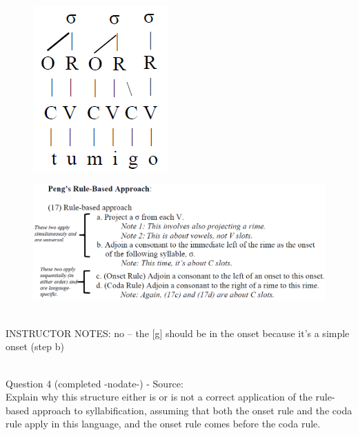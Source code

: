 \documentclass[12pt]{article}
\begin{document}
\begin{figure}[H]
\includegraphics{../images/pengrules_tumigo_no.png}
\end{figure}
\begin{figure}[H]
\includegraphics{../images/peng_rules.png}
\end{figure}

~\\
INSTRUCTOR NOTES: no -- the [g] should be in the onset because it's a simple onset (step b)


~\\

{\large Question 4} (completed -nodate-) - Source: \\

Explain why this structure either is or is not a correct application of the rule-based approach to syllabification, assuming that both the onset rule and the coda rule apply in this language, and the onset rule comes before the coda rule.\\
\end{document}
